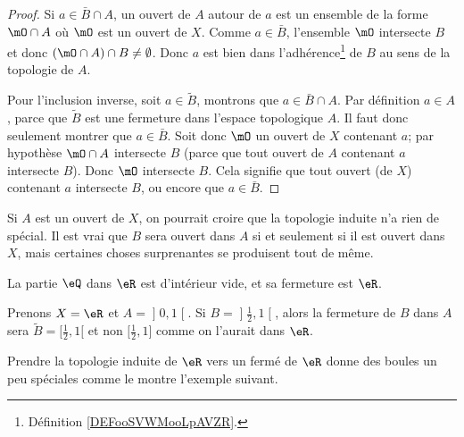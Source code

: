\begin{proof}
	Si \( a\in \bar B\cap A\), un ouvert de \( A\) autour de \( a\) est un ensemble de la forme \( \mO\cap A\) où \( \mO\) est un ouvert de \( X\). Comme \( a\in\bar B\), l'ensemble \( \mO\) intersecte \( B\) et donc \( (\mO\cap A)\cap B\neq \emptyset\). Donc \( a\) est bien dans l'adhérence\footnote{Définition \ref{DEFooSVWMooLpAVZR}.} de \( B\) au sens de la topologie de \( A\).

	Pour l'inclusion inverse, soit \( a\in \tilde  B\), montrons que \( a\in \bar B\cap A\). Par définition \( a\in A\), parce que \( \tilde B\) est une fermeture dans l'espace topologique \( A\). Il faut donc seulement montrer que \( a\in\bar B\). Soit donc \( \mO\) un ouvert de \( X\) contenant \( a\); par hypothèse \( \mO\cap A\) intersecte \( B\) (parce que tout ouvert de \( A\) contenant \( a\) intersecte \( B\)). Donc \( \mO\) intersecte \( B\). Cela signifie que tout ouvert (de \( X\)) contenant \( a\) intersecte \( B\), ou encore que \( a\in \bar B\).
\end{proof}

Si \( A\) est un ouvert de \( X\), on pourrait croire que la topologie induite n'a rien de spécial. Il est vrai que \( B\) sera ouvert dans \( A\) si et seulement si il est ouvert dans \( X\), mais certaines choses surprenantes se produisent tout de même.

\begin{lemma}       \label{LEMooIGQCooOrroHT}
	La partie \( \eQ\) dans \( \eR\) est d'intérieur vide, et sa fermeture est \( \eR\).
\end{lemma}

\begin{example} \label{ExloeyoR}
	Prenons \( X=\eR\) et \( A=\mathopen] 0 , 1 \mathclose[\). Si \( B=\mathopen] \frac{ 1 }{2} , 1 \mathclose[ \), alors la fermeture de \( B\) dans \( A\) sera \( \tilde B=\mathopen[ \frac{ 1 }{2} , 1 [\) et non \( \mathopen[ \frac{ 1 }{2} , 1 \mathclose]\) comme on l'aurait dans \( \eR\).
\end{example}

Prendre la topologie induite de \( \eR\) vers un fermé de \( \eR\) donne des boules un peu spéciales comme le montre l'exemple suivant.

